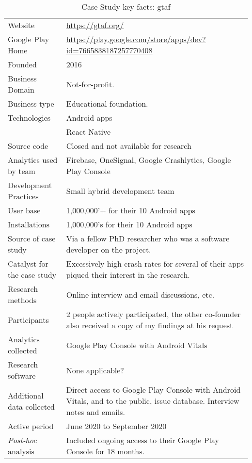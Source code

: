 {\begin{table*}[h]
    \centering
    \small
    \setlength{\tabcolsep}{6pt}
    \begin{tabular}{lp{11cm}}
       \toprule
       Website &\url{https://gtaf.org/} \\
       Google Play Home & \url{https://play.google.com/store/apps/dev?id=7665838187257770408} \\
       Founded & 2016 \\
       Business Domain & Not-for-profit.  \\
       Business type & Educational foundation. \\
       Technologies  & Android apps\footnotemark \\
       & React Native \\
       Source code  & Closed and not available for research \\
       Analytics used by team & Firebase, OneSignal, Google Crashlytics, Google Play Console \\
       Development Practices & Small hybrid development team \\
       \arrayrulecolor{blue!20}\midrule
       User base & 1,000,000'+ for their 10 Android apps \\
       Installations & 1,000,000's for their 10 Android apps \\
       \arrayrulecolor{blue!20}\midrule
       Source of case study &Via a fellow PhD researcher who was a software developer on the project. \\
       Catalyst for the case study &Excessively high crash rates for several of their apps piqued their interest in the research. \\
       \arrayrulecolor{blue!20}\midrule
       Research methods &Online interview and email discussions, etc. \\
       Participants & 2 people actively participated, the other co-founder also received a copy of my findings at his request\\
       Analytics collected &Google Play Console with Android Vitals \\
       Research software & None applicable? \\
       Additional data collected &Direct access to Google Play Console with Android Vitals, and to the public, issue database. Interview notes and emails. \\
       Active period & June 2020 to September 2020 \\
       \arrayrulecolor{blue!20}\midrule
       \emph{Post-hoc} analysis &Included ongoing access to their Google Play Console for 18 months. \\
       \bottomrule
    \end{tabular}
    \caption{Case Study key facts: \acrshort{gtaf}}
    \label{tab:gtaf_anaytics_overview}
\end{table*}
}


